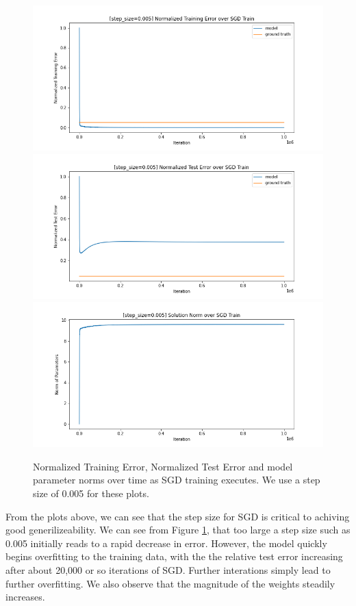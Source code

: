 \documentclass[12pt]{article}
\begin{document}
\begin{enumerate}[label=(\alph*)]
    \begin{figure}[!ht]
      \centering
      \includegraphics[scale=0.5]{figures/training_error_for_iter_large.png}
      \includegraphics[scale=0.5]{figures/test_error_for_iter_large.png}
      \includegraphics[scale=0.5]{figures/solution_norms_for_iter_large.png}
      \caption{Normalized Training Error, Normalized Test Error and model parameter norms over time as SGD training executes. We use a step size of 0.005 for these plots.}
      \label{fig:sgd_iter_large}
    \end{figure}

    From the plots above, we can see that the step size for SGD is critical to achiving good generilizeability. We can see from Figure \ref{fig:sgd_iter_large}, that too large a step size such as 0.005 initially reads to a rapid decrease in error. However, the model quickly begins overfitting to the training data, with the the relative test error increasing after about 20,000 or so iterations of SGD. Further interations simply lead to further overfitting. We also observe that the magnitude of the weights steadily increases.


\end{enumerate}
\end{document}
